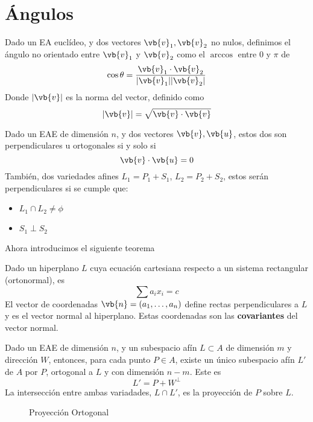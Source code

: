 \documentclass{./Geometria.tex}
\begin{document}
\section{Ángulos}
\begin{defin}
	Dado un EA euclídeo, y dos vectores $\vb{v}_{1}, \vb{v}_{2}$ no nulos, definimos el ángulo no orientado entre $\vb{v}_{1}$ y $\vb{v}_{2}$ como el $\arccos$ entre $0$ y $\pi$ de
	\[
		\cos \theta = \frac{\vb{v}_{1}\cdot \vb{v}_{2}}{|\vb{v}_{1}||\vb{v}_{2}|}
	\]
	Donde $|\vb{v}|$ es la norma del vector, definido como
	\[
		|\vb{v}| = \sqrt{\vb{v}\cdot \vb{v}}
	\]
\end{defin}
\begin{defin}[Perpendicularidad]
	Dado un EAE de dimensión $n$, y dos vectores $\vb{v}, \vb{u}$, estos dos son perpendiculares u ortogonales si y solo si
	\[
		\vb{v}\cdot \vb{u} = 0
	\]
	También, dos variedades afines $L_1=P_1+S_1$, $L_2=P_2+S_2$, estos serán perpendiculares si se cumple que:
	\begin{itemize}
		\item $L_1 \cap L_2 \neq \phi$
		\item $S_1 \perp S_2$ 
	\end{itemize}
\end{defin}
Ahora introducimos el siguiente teorema
\pagebreak
\begin{teorema}
	Dado un hiperplano $L$ cuya ecuación cartesiana respecto a un sistema rectangular (ortonormal), es
	\[
		\sum a_{i}x_{i} = c
	\]
	El vector de coordenadas $\vb{n} = (a_1,\dots ,a_{n})$ define rectas perpendiculares a $L$ y es el vector normal al hiperplano. Estas coordenadas son las \textbf{covariantes} del vector normal.  
\end{teorema}
\begin{defin}
	Dado un EAE de dimensión $n$, y un subespacio afín $L \subset A$ de dimensión $m$ y dirección $W$, entonces, para cada punto $P \in A$, existe un único subespacio afín $L'$ de $A$ por $P$, ortogonal a $L$ y con dimensión $n-m$. Este es
	\[
		L' = P + W^{\perp}
	\]
	La intersección entre ambas variadades, $L \cap L'$, es la proyección de $P$ sobre $L$.   
\end{defin}
\begin{figure}[ht]
    \centering
    \caption{Proyección Ortogonal}
    \label{fig:p-ortogonal}
\end{figure}
\end{document}
